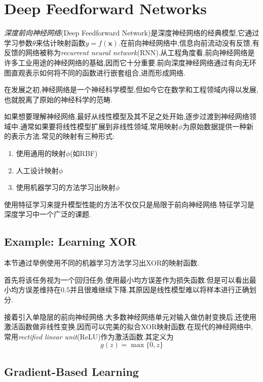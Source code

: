 \chapter{Deep Feedforward Networks}

\textit{深度前向神经网络}(Deep Feedforward Network)是深度神经网络的经典模型,它通过学习参数$\theta$来估计映射函数$y=f(\mathbf x)$.在前向神经网络中,信息向前流动没有反馈,有反馈的网络被称为\textit{recurrent neural network}(RNN).从工程角度看,前向神经网络是许多工业用途的神经网络的基础,因而它十分重要.前向深度神经网络通过有向无环图直观表示如何将不同的函数进行嵌套组合,进而形成网络.

在发展之初,神经网络是一个神经科学模型,但如今它在数学和工程领域内得以发展,也就脱离了原始的神经科学的范畴.

如果想要理解神经网络,最好从线性模型及其不足之处开始,逐步过渡到神经网络领域中.通常如果要将线性模型扩展到非线性领域,常用映射$\phi$为原始数据提供一种新的表示方法.常见的映射有三种形式:
\begin{enumerate}
\item 使用通用的映射$\phi$(如RBF)
\item 人工设计映射$\phi$
\item 使用机器学习的方法学习出映射$\phi$
\end{enumerate}

使用特征学习来提升模型性能的方法不仅仅只是局限于前向神经网络.特征学习是深度学习中一个广泛的课题.

\section{Example: Learning XOR}

本节通过举例使用不同的机器学习方法学习出XOR的映射函数.

首先将该任务视为一个回归任务,使用最小均方误差作为损失函数.但是可以看出最小均方误差维持在$0.5$并且很难继续下降.其原因是线性模型难以将样本进行正确划分.

接着引入单隐层的前向神经网络.大多数神经网络单元对输入做仿射变换后,还使用激活函数做非线性变换,因而可以完美的拟合XOR映射函数.在现代的神经网络中,常用\textit{rectified linear unit}(ReLU)作为激活函数.其定义为
\begin{equation}
g(z)=\max\{0,z\}
\end{equation}

\section{Gradient-Based Learning}

